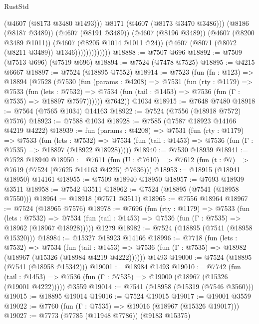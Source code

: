 \begin{lexlean}{RustStd}
\begin{coremodule}
                              (@4607 (@8173 @3480 @1493)))
                            @8171
                            (@4607 (@8173 @3470 @3486)))
                          (@8186 (@8187 @3489))
                          (@4607 (@8191 @3489))
                          (@4607 (@8196 @3489))
                          (@4607 (@8200 @3489 @1011))
                          (@4607 (@8205 @1014 @1011 @24))
                          (@4607 (@8071 (@8072 (@8211 @3489)) @1346)))))))))))))
@18888 := @7507 @696
@18892 := @7509 (@7513 @696) (@7519 @696)
@18894 := @7524 (@7478 @7525)
@18895 := @4215 @6667
@18897 := @7524 (@18895 @7552)
@18914 := @7523
    (fun (fn : @123) =>
    @18894
      (@7528
        (@7530
          (fun (params : @4208) =>
          @7531
            (fun (rty : @1179) =>
            @7533
              (fun (lets : @7532) =>
              @7534 (fun (tail : @1453) => @7536 (fun (Γ : @7535) => @18897 @7597))))))
        @7642))
    @1034
@18915 := @7648 @7480
@18918 := @7564 (@7565 @1034) @14163
@18922 := @7524 (@7556 (@18918 @7572) @7576)
@18923 := @7588 @1034
@18928 := @7585 (@7587 @18923 @14166 @4219 @4222)
@18939 := fun (params : @4208) =>
  @7531
    (fun (rty : @1179) =>
    @7533
      (fun (lets : @7532) =>
      @7534 (fun (tail : @1453) => @7536 (fun (Γ : @7535) => @18897 (@18922 @18928)))))
@18940 := @7530 @18939
@18941 := @7528 @18940
@18950 := @7611
    (fun (U : @7610) => @7612 (fun (t : @7) => @7619 (@7524 (@7625 @14163 @4225) @7636)))
@18953 := @18915 (@18941 @18950) @14161
@18955 := @7509 @18940 @18950
@18957 := @7693 @18939 @3511
@18958 := @7542 @3511
@18962 := @7524 (@18895 (@7541 (@18958 @7550)))
@18964 := @18918 (@7571 @3511)
@18965 := @7556 @18964
@18967 := @7524 (@18965 @7576)
@18978 := @7696
    (fun (rty : @1179) =>
    @7533
      (fun (lets : @7532) =>
      @7534 (fun (tail : @1453) => @7536 (fun (Γ : @7535) => @18962 (@18967 @18928)))))
    @1279
@18982 := @7524 (@18895 (@7541 (@18958 @15320)))
@18984 := @15327 @18923 @14166
@18996 := @7718
    (fun (lets : @7532) =>
    @7534
      (fun (tail : @1453) =>
      @7536 (fun (Γ : @7535) => @18982 (@18967 (@15326 (@18984 @4219 @4222))))))
    @1493
@19000 := @7524 (@18895 (@7541 (@18958 @15342)))
@19001 := @18984 @1493
@19010 := @7742
    (fun (tail : @1453) => @7536 (fun (Γ : @7535) => @19000 (@18967 (@15326 (@19001 @4222)))))
    @3559
@19014 := @7541 (@18958 (@15319 (@7546 @3560)))
@19015 := @18895 @19014
@19016 := @7524 @19015
@19017 := @19001 @3559
@19022 := @7760 (fun (Γ : @7535) => @19016 (@18967 (@15326 @19017)))
@19027 := @7773 (@7785 (@11948 @7786)) (@9183 @15375)

\end{coremodule}
\end{lexlean}
